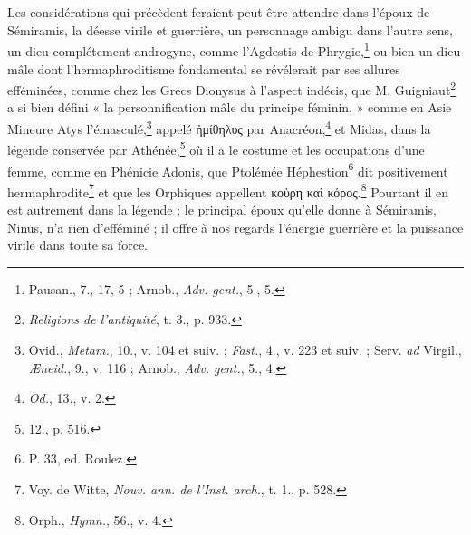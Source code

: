 \documentclass[a4paper, 11pt, oneside, landscape]{article}
\begin{document}
\bigskip \centerline{\EightStarTaper} \centerline{\EightStarTaper\EightStarTaper} \bigskip\clearpage
\section{}
\paragraph{}
Les considérations qui précèdent feraient peut-être attendre dans l'époux de Sémiramis, la déesse virile et guerrière, un personnage ambigu dans l'autre sens, un dieu complétement androgyne, comme l'Agdestis de Phrygie,\footnote{Pausan., 7., 17, 5 ; Arnob., \emph{Adv. gent.}, 5., 5.} ou bien un dieu mâle dont l'hermaphroditisme fondamental se révélerait par ses allures efféminées, comme chez les Grecs Dionysus à l'aspect indécis, que M. Guigniaut\footnote{\emph{Religions de l'antiquité}, t. 3., p. 933.} a si bien défini « la personnification mâle du principe féminin, » comme en Asie Mineure Atys l'émasculé,\footnote{Ovid., \emph{Metam.}, 10., v. 104 et suiv. ; \emph{Fast.}, 4., v. 223 et suiv. ; Serv. \emph{ad} Virgil., \emph{Æneid.}, 9., v. 116 ; Arnob., \emph{Adv. gent.}, 5., 4.} appelé ἠμίθηλυς par Anacréon,\footnote{\emph{Od.}, 13., v. 2.} et Midas, dans la légende conservée par Athénée,\footnote{12., p. 516.} où il a le costume et les occupations d'une femme, comme en Phénicie Adonis, que Ptolémée Héphestion\footnote{P. 33, ed. Roulez.} dit positivement hermaphrodite\footnote{Voy. de Witte, \emph{Nouv. ann. de l'Inst. arch.}, t. 1., p. 528.} et que les Orphiques appellent κοὑρη καὶ κόρος.\footnote{Orph., \emph{Hymn.}, 56., v. 4.} Pourtant il en est autrement dans la légende ; le principal époux qu'elle donne à Sémiramis, Ninus, n'a rien d'efféminé ; il offre à nos regards l'énergie guerrière et la puissance virile dans toute sa force.
\end{document}
